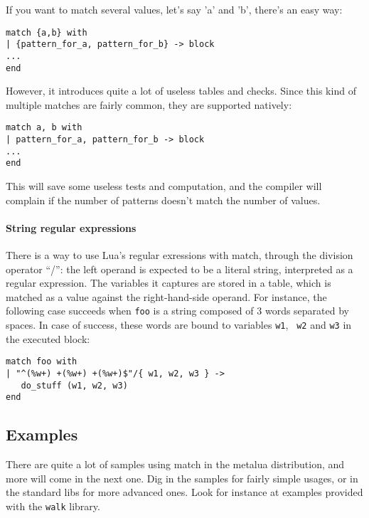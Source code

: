 If you want to match several values, let's say 'a' and 'b', there's an easy way:

\begin{verbatim}
match {a,b} with
| {pattern_for_a, pattern_for_b} -> block
...
end
\end{verbatim}

However, it introduces quite a lot of useless tables and checks. Since this kind
of multiple matches are fairly common, they are supported natively:

\begin{verbatim}
match a, b with
| pattern_for_a, pattern_for_b -> block
...
end
\end{verbatim}

This will save some useless tests and computation, and the compiler will
complain if the number of patterns doesn't match the number of values.

\paragraph{String regular expressions}
There is a way to use Lua's regular exressions with match, through the division
operator ``/'': the left operand is expected to be a literal string, interpreted
as a regular expression. The variables it captures are stored in a table, which
is matched as a value against the right-hand-side operand. For instance, the
following case succeeds when {\tt foo} is a string composed of 3 words separated
by spaces. In case of success, these words are bound to variables {\tt w1}, {\tt
  w2} and {\tt w3} in the executed block:

\begin{verbatim}
match foo with
| "^(%w+) +(%w+) +(%w+)$"/{ w1, w2, w3 } -> 
   do_stuff (w1, w2, w3)
end
\end{verbatim}

\subsection{Examples}
There are quite a lot of samples using match in the metalua distribution, and
more will come in the next one. Dig in the samples for fairly simple usages, or
in the standard libs for more advanced ones. Look for instance at examples
provided with the {\tt walk} library.

